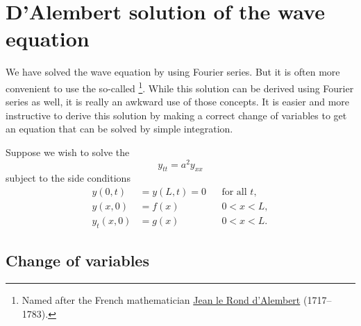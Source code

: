 
\section{D'Alembert solution of the wave equation}
\label{dalemb:section}





We have solved the wave equation by using Fourier series.  But it is often
more convenient to use the so-called
\emph{}%
\footnote{Named after the French mathematician
\href{https://en.wikipedia.org/wiki/D\%27Alembert}{Jean le Rond d'Alembert}
(1717--1783).}.
While this solution can be derived using Fourier series as well, it
is really an awkward use of those concepts.  It is easier and more
instructive to derive this
solution by making a correct change of variables to get an equation that
can be solved by simple integration.

Suppose we wish to solve the 
\begin{equation} \label{dalemb:weq}
y_{tt} = a^2 y_{xx}
\end{equation}
subject to the side conditions
\begin{equation} \label{dalemb:weqside}
\begin{aligned}
y(0,t) &=  y(L,t) = 0 &
& \text{for all } t , \\
y(x,0) &= f(x) &  & 0 < x < L , \\
y_t(x,0) &= g(x) &  & 0 < x < L .
\end{aligned}
\end{equation}

\subsection{Change of variables}

